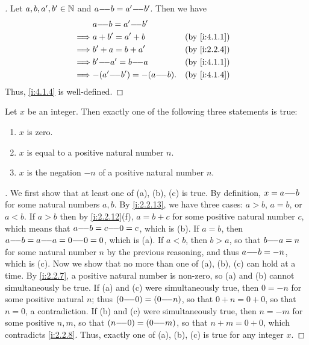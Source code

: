 \begin{proof}[]
  Let \(a, b, a', b' \in \mathbb{N}\) and \(a {-}\!{-} b = a' {-}\!{-} b'\).
  Then we have
  \begin{align*}
             & a \mm b = a' \mm b'                            \\
    \implies & a + b' = a' + b              &  & \by{i:4.1.1} \\
    \implies & b' + a = b + a'              &  & \by{i:2.2.4} \\
    \implies & b' \mm a' = b \mm a          &  & \by{i:4.1.1} \\
    \implies & {-}(a' \mm b') = -(a \mm b). &  & \by{i:4.1.4}
  \end{align*}
  Thus, \cref{i:4.1.4} is well-defined.
\end{proof}

\begin{lem}\label{i:4.1.5}
  Let \(x\) be an integer.
  Then exactly one of the following three statements is true:
  \begin{enumerate}
    \item \(x\) is zero.
    \item \(x\) is equal to a positive natural number \(n\).
    \item \(x\) is the negation \(-n\) of a positive natural number \(n\).
  \end{enumerate}
\end{lem}

\begin{proof}[]
  We first show that at least one of (a), (b), (c) is true.
  By definition, \(x = a {-}\!{-} b\) for some natural numbers \(a, b\).
  By \cref{i:2.2.13}, we have three cases: \(a > b\), \(a = b\), or \(a < b\).
  If \(a > b\) then by \cref{i:2.2.12}(f), \(a = b + c\) for some positive natural number \(c\), which means that \(a {-}\!{-} b = c {-}\!{-} 0 = c\), which is (b).
  If \(a = b\), then \(a {-}\!{-} b = a {-}\!{-} a = 0 {-}\!{-} 0 = 0\), which is (a).
  If \(a < b\), then \(b > a\), so that \(b {-}\!{-} a = n\) for some natural number \(n\) by the previous reasoning, and thus \(a {-}\!{-} b = -n\), which is (c).
  Now we show that no more than one of (a), (b), (c) can hold at a time.
  By \cref{i:2.2.7}, a positive natural number is non-zero, so (a) and (b) cannot simultaneously be true.
  If (a) and (c) were simultaneously true, then \(0 = -n\) for some positive natural \(n\);
  thus \((0 {-}\!{-} 0) = (0 {-}\!{-} n)\), so that \(0 + n = 0 + 0\), so that \(n = 0\), a contradiction.
  If (b) and (c) were simultaneously true, then \(n = -m\) for some positive \(n, m\), so that \((n {-}\!{-} 0) = (0 {-}\!{-} m)\), so that \(n + m = 0 + 0\), which contradicts \cref{i:2.2.8}.
  Thus, exactly one of (a), (b), (c) is true for any integer \(x\).
\end{proof}

